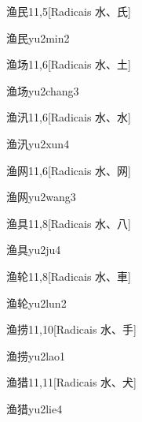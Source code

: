 \begin{entry}{渔民}{11,5}[Radicais ⽔、⽒]
  \begin{phonetics}{渔民}{yu2min2}
  \end{phonetics}
\end{entry}

\begin{entry}{渔场}{11,6}[Radicais ⽔、⼟]
  \begin{phonetics}{渔场}{yu2chang3}
  \end{phonetics}
\end{entry}

\begin{entry}{渔汛}{11,6}[Radicais ⽔、⽔]
  \begin{phonetics}{渔汛}{yu2xun4}
  \end{phonetics}
\end{entry}

\begin{entry}{渔网}{11,6}[Radicais ⽔、⽹]
  \begin{phonetics}{渔网}{yu2wang3}
  \end{phonetics}
\end{entry}

\begin{entry}{渔具}{11,8}[Radicais ⽔、⼋]
  \begin{phonetics}{渔具}{yu2ju4}
  \end{phonetics}
\end{entry}

\begin{entry}{渔轮}{11,8}[Radicais ⽔、⾞]
  \begin{phonetics}{渔轮}{yu2lun2}
  \end{phonetics}
\end{entry}

\begin{entry}{渔捞}{11,10}[Radicais ⽔、⼿]
  \begin{phonetics}{渔捞}{yu2lao1}
  \end{phonetics}
\end{entry}

\begin{entry}{渔猎}{11,11}[Radicais ⽔、⽝]
  \begin{phonetics}{渔猎}{yu2lie4}
  \end{phonetics}
\end{entry}

